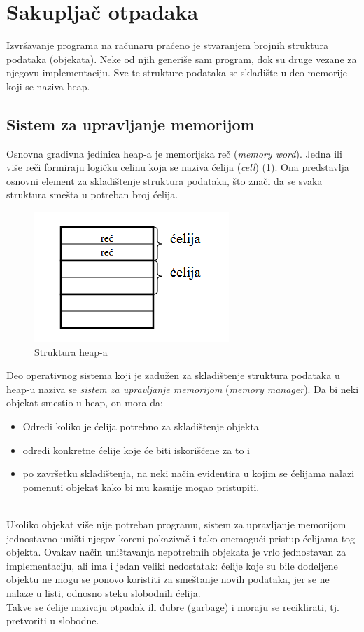 \section{Sakupljač otpadaka}
\label{sec:djubretar}

Izvršavanje programa na računaru praćeno je stvaranjem brojnih struktura podataka (objekata).
Neke od njih generiše sam program, dok su druge vezane za njegovu implementaciju. Sve te strukture podataka se skladište u deo memorije koji se naziva heap.

\subsection{Sistem za upravljanje memorijom}
\label{subsec:sistem}

Osnovna gradivna jedinica heap-a je memorijska reč (\textit{memory word}). Jedna ili više reči  formiraju logičku celinu koja se naziva ćelija (\textit{cell}) (\ref{fig:slika 1}). Ona predstavlja osnovni element za skladištenje struktura podataka, što znači da se svaka struktura smešta u potreban broj ćelija.

\begin{figure}[h!]
\begin{center}
\includegraphics[scale=0.75]{celija.png}
\end{center}
\caption{Struktura heap-a}
\label{fig:slika 1}
\end{figure}

Deo operativnog sistema koji je zadužen za skladištenje struktura podataka u heap-u naziva se \textit{sistem za upravljanje memorijom} (\textit{memory manager}). Da bi neki objekat smestio u heap, on mora da:
\begin{itemize}
\item Odredi koliko je ćelija potrebno za skladištenje objekta
\item odredi konkretne ćelije koje će biti iskorišćene za to i
\item po završetku skladištenja, na neki način evidentira u kojim se ćelijama nalazi pomenuti objekat kako bi mu kasnije mogao pristupiti.
\end{itemize}
~
\\
\indent Ukoliko objekat više nije potreban programu, sistem za upravljanje memorijom
jednostavno uništi njegov koreni pokazivač i tako onemogući pristup ćelijama tog objekta. Ovakav način uništavanja nepotrebnih objekata je vrlo jednostavan za implementaciju, ali ima i jedan veliki nedostatak: ćelije koje su bile dodeljene objektu ne mogu se ponovo koristiti za smeštanje novih podataka, jer se ne nalaze u listi, odnosno steku slobodnih ćelija.
\\
Takve se ćelije nazivaju otpadak ili đubre (garbage) i moraju se reciklirati, tj. pretvoriti u slobodne.


